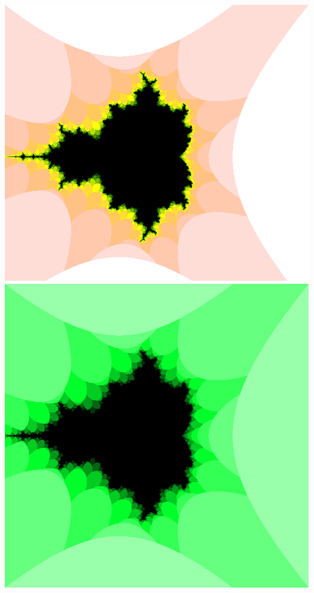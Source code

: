 \documentclass[../resume.tex]{subfiles}
\begin{document}
\noindent
\includegraphics[scale=0.15]{../TAing/mandel/dark.png}
\includegraphics[scale=0.15]{../TAing/mandel/green.png}
\end{document}
